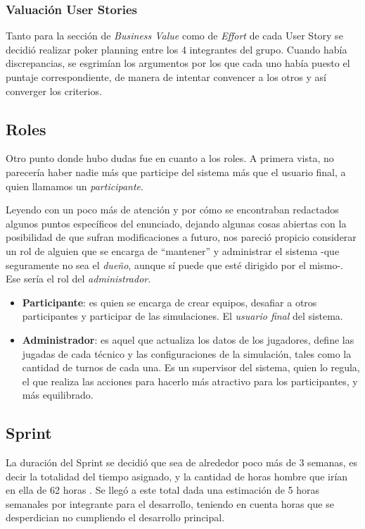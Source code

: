 \subsubsection*{Valuación User Stories}
Tanto para la sección de \emph{Business Value} como de \emph{Effort} de cada User Story se decidió realizar poker planning entre los 4 integrantes del grupo. Cuando había discrepancias, se esgrimían los argumentos por los que cada uno había puesto el puntaje correspondiente, de manera de intentar convencer a los otros y así converger los criterios.

\subsection*{Roles}
Otro punto donde hubo dudas fue en cuanto a los roles. A primera vista, no parecería haber nadie más que participe del sistema más que el usuario final, a quien llamamos un \emph{participante}. 

Leyendo con un poco más de atención y por cómo se encontraban redactados algunos puntos específicos del enunciado, dejando algunas cosas abiertas con la posibilidad de que sufran modificaciones a futuro, nos pareció propicio considerar un rol de alguien que se encarga de ``mantener'' y administrar el sistema -que seguramente no sea el \emph{dueño}, aunque sí puede que esté dirigido por el mismo-. Ese sería el rol del \emph{administrador}.
\begin{itemize}
\item \textbf{Participante}: es quien se encarga de crear equipos, desafiar a otros participantes y participar de las simulaciones. El \textit{usuario final} del sistema.
\item \textbf{Administrador}: es aquel que actualiza los datos de los jugadores, define las jugadas de cada técnico y las configuraciones de la simulación, tales como la cantidad de turnos de cada una. Es un supervisor del sistema, quien lo regula, el que realiza las acciones para hacerlo más atractivo para los participantes, y más equilibrado.
\end{itemize}

\subsection{Sprint}
La duración del Sprint se decidió que sea de alrededor poco más de 3 semanas, es decir la totalidad del tiempo asignado, y la cantidad de horas hombre que irían en ella de 62 horas . Se llegó a este total dada una estimación de 5 horas semanales por integrante para el desarrollo, teniendo en cuenta horas que se desperdician no cumpliendo el desarrollo principal.\\